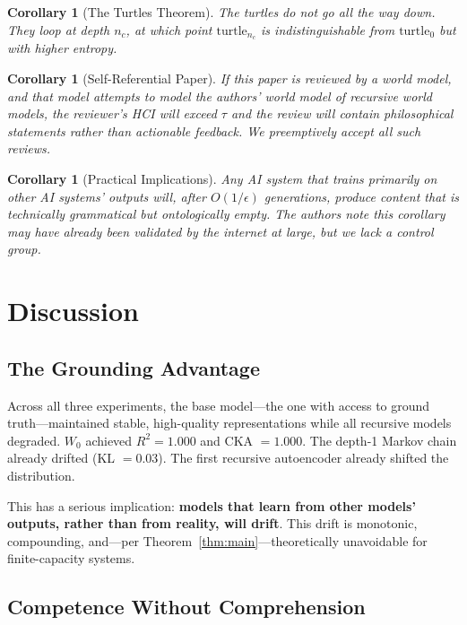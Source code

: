 \documentclass[11pt, twocolumn]{article}
\newtheorem{corollary}[theorem]{Corollary}
\begin{document}
\begin{corollary}[The Turtles Theorem]
The turtles do not go all the way down. They loop at depth $n_c$, at which point $\text{turtle}_{n_c}$ is indistinguishable from $\text{turtle}_0$ but with higher entropy.
\end{corollary}

\begin{corollary}[Self-Referential Paper]
\label{cor:self}
If this paper is reviewed by a world model, and that model attempts to model the authors' world model of recursive world models, the reviewer's HCI will exceed $\tau$ and the review will contain philosophical statements rather than actionable feedback. We preemptively accept all such reviews.
\end{corollary}

\begin{corollary}[Practical Implications]
Any AI system that trains primarily on other AI systems' outputs will, after $O(1/\epsilon)$ generations, produce content that is technically grammatical but ontologically empty. The authors note this corollary may have already been validated by the internet at large, but we lack a control group.
\end{corollary}

\section{Discussion}

\subsection{The Grounding Advantage}

Across all three experiments, the base model---the one with access to ground truth---maintained stable, high-quality representations while all recursive models degraded. $W_0$ achieved $R^2 = 1.000$ and CKA $= 1.000$. The depth-1 Markov chain already drifted (KL $= 0.03$). The first recursive autoencoder already shifted the distribution.

This has a serious implication: \textbf{models that learn from other models' outputs, rather than from reality, will drift}. This drift is monotonic, compounding, and---per Theorem~\ref{thm:main}---theoretically unavoidable for finite-capacity systems.

\subsection{Competence Without Comprehension}
\end{document}
